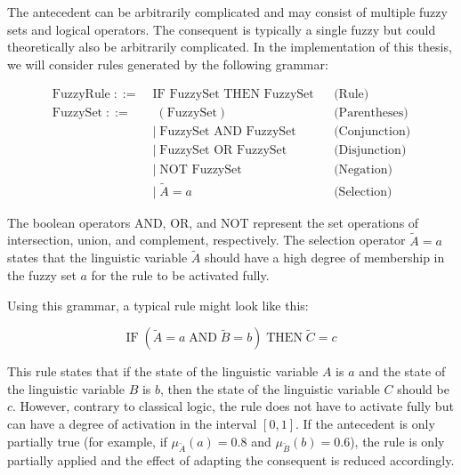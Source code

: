 The antecedent can be arbitrarily complicated and may consist of multiple fuzzy sets and logical operators. The consequent is typically a single fuzzy but could theoretically also be arbitrarily complicated. In the implementation of this thesis, we will consider rules generated by the following grammar:

\newcommand{\fuzzyset}{\langle \text{fuzzy set} \rangle}

\newcommand{\fuzzyrule}{\langle \text{rule} \rangle}

\begin{align*}
      \text{FuzzyRule} \;::=\; & \text{IF } \text{FuzzySet } \text{THEN } \text{FuzzySet} &  & \text{(Rule)}        \\[10pt]
      \text{FuzzySet} \;::=\;  & \; (\text{FuzzySet})                                     &  & \text{(Parentheses)} \\
                               & | \;\text{FuzzySet } \text{AND } \text{FuzzySet}         &  & \text{(Conjunction)} \\
                               & | \;\text{FuzzySet } \text{OR } \text{FuzzySet}          &  & \text{(Disjunction)} \\
                               & | \;\text{NOT } \text{FuzzySet}                          &  & \text{(Negation)}    \\
                               & | \;\tilde{A} = a                                        &  & \text{(Selection)}
\end{align*}

The boolean operators AND, OR, and NOT represent the set operations of intersection, union, and complement, respectively. The selection operator $\tilde{A} = a$ states that the linguistic variable $\tilde{A}$ should have a high degree of membership in the fuzzy set $a$ for the rule to be activated fully.


Using this grammar, a typical rule might look like this:

\begin{equation*}
      \text{IF} \;( \tilde{A} = a \; \text{AND} \; \tilde{B} = b )\; \text{THEN} \; \tilde{C} = c
\end{equation*}

This rule states that if the state of the linguistic variable $A$ is $a$ and the state of the linguistic variable $B$ is $b$, then the state of the linguistic variable $C$ should be $c$. However, contrary to classical logic, the rule does not have to activate fully but can have a degree of activation in the interval $[0, 1]$. If the antecedent is only partially true (for example, if $\mu_{\tilde{A}}(a) = 0.8$ and $\mu_{\tilde{B}}(b) = 0.6$), the rule is only partially applied and the effect of adapting the consequent is reduced accordingly.

